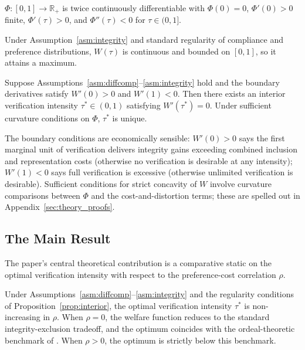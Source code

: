\begin{assumption}
\label{asm:integrity}
$\Phi: [0,1] \to \mathbb{R}_+$ is twice continuously differentiable with $\Phi(0) = 0$, $\Phi'(0) > 0$ finite, $\Phi'(\tau) > 0$, and $\Phi''(\tau) < 0$ for $\tau \in (0, 1]$.
\end{assumption}

Under Assumption~\ref{asm:integrity} and standard regularity of compliance and preference distributions, $W(\tau)$ is continuous and bounded on $[0, 1]$, so it attains a maximum.

\begin{proposition}
\label{prop:interior}
Suppose Assumptions~\ref{asm:diffcomp}--\ref{asm:integrity} hold and the boundary derivatives satisfy $W'(0) > 0$ and $W'(1) < 0$. Then there exists an interior verification intensity $\tau^* \in (0, 1)$ satisfying $W'(\tau^*) = 0$. Under sufficient curvature conditions on $\Phi$, $\tau^*$ is unique.
\end{proposition}

The boundary conditions are economically sensible: $W'(0) > 0$ says the first marginal unit of verification delivers integrity gains exceeding combined inclusion and representation costs (otherwise no verification is desirable at any intensity); $W'(1) < 0$ says full verification is excessive (otherwise unlimited verification is desirable). Sufficient conditions for strict concavity of $W$ involve curvature comparisons between $\Phi$ and the cost-and-distortion terms; these are spelled out in Appendix~\ref{sec:theory_proofs}.

\subsection{The Main Result}
\label{ssec:main_result}

The paper's central theoretical contribution is a comparative static on the optimal verification intensity with respect to the preference-cost correlation $\rho$.

\begin{proposition}
\label{prop:main}
Under Assumptions~\ref{asm:diffcomp}--\ref{asm:integrity} and the regularity conditions of Proposition~\ref{prop:interior}, the optimal verification intensity $\tau^*$ is non-increasing in $\rho$. When $\rho = 0$, the welfare function reduces to the standard integrity-exclusion tradeoff, and the optimum coincides with the ordeal-theoretic benchmark of \citet{NicholsZeckhauser1982}. When $\rho > 0$, the optimum is strictly below this benchmark.
\end{proposition}

